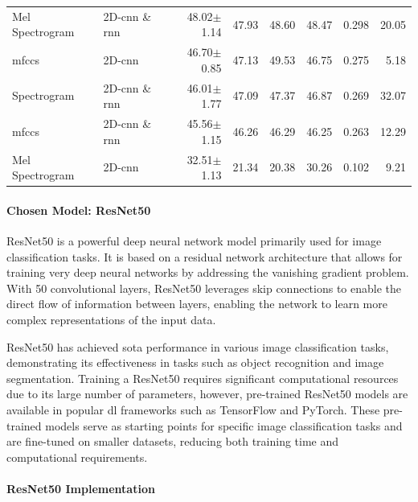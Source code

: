 \begin{table}[H]
{\begin{tabular}{llrrrrrr}
			Mel Spectrogram & 2D-\ac{cnn} \& \ac{rnn} & 48.02$\pm$1.14 & 47.93 & 48.60 & 48.47 & 0.298 & 20.05 \\
			
			\ac{mfccs} &  2D-\ac{cnn} & 46.70$\pm$0.85 & 47.13 & 49.53 & 46.75 & 0.275 & 5.18 \\
			
			Spectrogram & 2D-\ac{cnn} \& \ac{rnn} & 46.01$\pm$1.77 & 47.09 & 47.37 & 46.87 & 0.269 & 32.07 \\
			
			\ac{mfccs} & 2D-\ac{cnn} \& \ac{rnn} & 45.56$\pm$1.15 & 46.26 & 46.29 & 46.25 & 0.263 & 12.29 \\
			
			Mel Spectrogram &  2D-\ac{cnn} & 32.51$\pm$1.13 & 21.34 & 20.38 & 30.26 & 0.102 & 9.21 \\
			
			\bottomrule
		\end{tabular}%
	}
\end{table}

\paragraph{Chosen Model: ResNet50}

ResNet50 is a powerful deep neural network model primarily used for image classification tasks. It is based on a residual network architecture that allows for training very deep neural networks by addressing the vanishing gradient problem. With 50 convolutional layers, ResNet50 leverages skip connections to enable the direct flow of information between layers, enabling the network to learn more complex representations of the input data.

ResNet50 has achieved \ac{sota} performance in various image classification tasks, demonstrating its effectiveness in tasks such as object recognition and image segmentation. Training a ResNet50 requires significant computational resources due to its large number of parameters, however, pre-trained ResNet50 models are available in popular \ac{dl} frameworks such as TensorFlow and PyTorch. These pre-trained models serve as starting points for specific image classification tasks and are fine-tuned on smaller datasets, reducing both training time and computational requirements.

\paragraph{ResNet50 Implementation}

